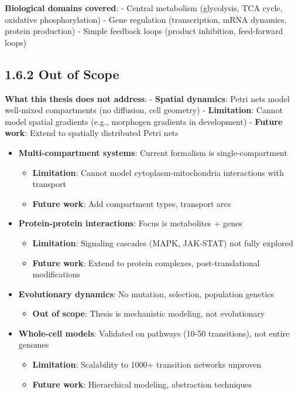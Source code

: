 \textbf{Biological domains covered}: - Central metabolism (glycolysis,
TCA cycle, oxidative phosphorylation) - Gene regulation (transcription,
mRNA dynamics, protein production) - Simple feedback loops (product
inhibition, feed-forward loops)

\hypertarget{out-of-scope}{%
\subsection{1.6.2 Out of Scope}\label{out-of-scope}}

\textbf{What this thesis does not address}: - \textbf{Spatial dynamics}:
Petri nets model well-mixed compartments (no diffusion, cell geometry) -
\textbf{Limitation}: Cannot model spatial gradients (e.g., morphogen
gradients in development) - \textbf{Future work}: Extend to spatially
distributed Petri nets

\begin{itemize}
\tightlist
\item
  \textbf{Multi-compartment systems}: Current formalism is
  single-compartment

  \begin{itemize}
  \tightlist
  \item
    \textbf{Limitation}: Cannot model cytoplasm-mitochondria
    interactions with transport
  \item
    \textbf{Future work}: Add compartment types, transport arcs
  \end{itemize}
\item
  \textbf{Protein-protein interactions}: Focus is metabolites + genes

  \begin{itemize}
  \tightlist
  \item
    \textbf{Limitation}: Signaling cascades (MAPK, JAK-STAT) not fully
    explored
  \item
    \textbf{Future work}: Extend to protein complexes,
    post-translational modifications
  \end{itemize}
\item
  \textbf{Evolutionary dynamics}: No mutation, selection, population
  genetics

  \begin{itemize}
  \tightlist
  \item
    \textbf{Out of scope}: Thesis is mechanistic modeling, not
    evolutionary
  \end{itemize}
\item
  \textbf{Whole-cell models}: Validated on pathways (10-50 transitions),
  not entire genomes

  \begin{itemize}
  \tightlist
  \item
    \textbf{Limitation}: Scalability to 1000+ transition networks
    unproven
  \item
    \textbf{Future work}: Hierarchical modeling, abstraction techniques
  \end{itemize}
\end{itemize}

